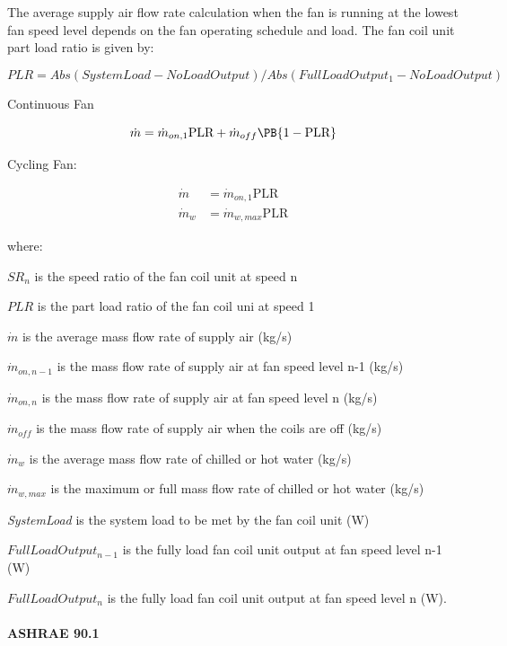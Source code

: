The average supply air flow rate calculation when the fan is running at the lowest fan speed level depends on the fan operating schedule and load. The fan coil unit part load ratio is given by:

\begin{equation}
{PLR} = Abs({SystemLoad} - {NoLoadOutput}) / Abs({FullLoadOutput_{1}} - {NoLoadOutput})
\end{equation}

Continuous Fan

\begin{equation}
  \dot{m} = \dot{m}_{on, 1} \text{PLR} + \dot{m}_{off} \PB{1 - \text{PLR}}
\end{equation}

Cycling Fan:

\begin{equation}
  \begin{array}{ll}
    \dot{m}   &= \dot{m}_{on, 1}\text{PLR} \\
    \dot{m}_w &= \dot{m}_{w, max} \text{PLR}
  \end{array}
\end{equation}

where:

$SR_n$ is the speed ratio of the fan coil unit at speed n

$PLR$ is the part load ratio of the fan coil uni at speed 1

$\dot{m}$ is the average mass flow rate of supply air (kg/s)

$\dot{m}_{on, n-1}$ is the mass flow rate of supply air at fan speed level n-1 (kg/s)

$\dot{m}_{on, n}$ is the mass flow rate of supply air at fan speed level n (kg/s)

$\dot{m}_{off}$ is the mass flow rate of supply air when the coils are off (kg/s)

$\dot{m}_{w}$ is the average mass flow rate of chilled or hot water (kg/s)

$\dot{m}_{w, max}$ is the maximum or full mass flow rate of chilled or hot water (kg/s)

\emph{SystemLoad} is the system load to be met by the fan coil unit (W)

$FullLoadOutput_{n-1}$ is the fully load fan coil unit output at fan speed level n-1 (W)

$FullLoadOutput_{n}$ is the fully load fan coil unit output at fan speed level n (W).

\paragraph{ASHRAE 90.1}\label{ashrae-90.1}

